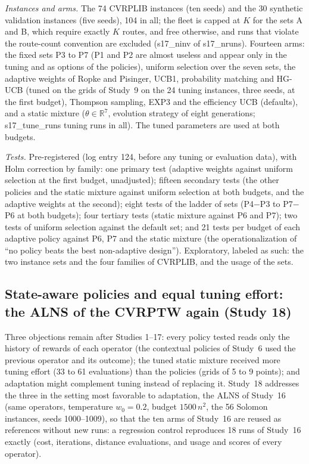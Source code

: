 \emph{Instances and arms.} The 74 CVRPLIB instances (ten seeds) and the 30 synthetic validation instances (five seeds), 104 in all; the fleet is capped at $K$ for the sets A and B, which require exactly $K$ routes, and free otherwise, and runs that violate the route-count convention are excluded (\num{s17_ninv} of \num{s17_nruns}). Fourteen arms: the fixed sets P3 to P7 (P1 and P2 are almost useless and appear only in the tuning and as options of the policies), uniform selection over the seven sets, the adaptive weights of Ropke and Pisinger, UCB1, probability matching and HG-UCB (tuned on the grids of Study~9 on the 24 tuning instances, three seeds, at the first budget), Thompson sampling, EXP3 and the efficiency UCB (defaults), and a static mixture ($\theta\in\mathbb{R}^7$, evolution strategy of eight generations; \num{s17_tune_runs} tuning runs in all). The tuned parameters are used at both budgets.

\emph{Tests.} Pre-registered (log entry 124, before any tuning or evaluation data), with Holm correction by family: one primary test (adaptive weights against uniform selection at the first budget, unadjusted); fifteen secondary tests (the other policies and the static mixture against uniform selection at both budgets, and the adaptive weights at the second); eight tests of the ladder of sets (P4$-$P3 to P7$-$P6 at both budgets); four tertiary tests (static mixture against P6 and P7); two tests of uniform selection against the default set; and 21 tests per budget of each adaptive policy against P6, P7 and the static mixture (the operationalization of ``no policy beats the best non-adaptive design''). Exploratory, labeled as such: the two instance sets and the four families of CVRPLIB, and the usage of the sets.

\subsection{State-aware policies and equal tuning effort: the ALNS of the CVRPTW again (Study 18)}\label{sec:s18design}
Three objections remain after Studies 1--17: every policy tested reads only the history of rewards of each operator (the contextual policies of Study~6 used the previous operator and its outcome); the tuned static mixture received more tuning effort (33 to 61 evaluations) than the policies (grids of 5 to 9 points); and adaptation might complement tuning instead of replacing it. Study~18 addresses the three in the setting most favorable to adaptation, the ALNS of Study~16 (same operators, temperature $w_0=0.2$, budget $1500\,n^2$, the 56 Solomon instances, seeds 1000--1009), so that the ten arms of Study~16 are reused as references without new runs: a regression control reproduces 18 runs of Study~16 exactly (cost, iterations, distance evaluations, and usage and scores of every operator).

